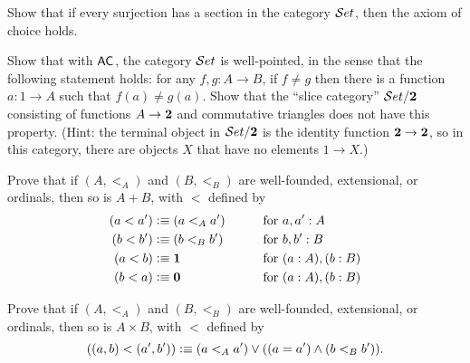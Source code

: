 \begin{ex}
  Show that if every surjection has a section in the category $\mathcal{S}et$, then the axiom of choice holds.
\end{ex}

\begin{ex}
Show that with $\mathsf{AC}_{}$, the category $\mathcal{S}et$ is well-pointed, in the sense that the following statement holds: for any $f, g : A\to B$, if $f \neq g$ then there is a function $a : 1\to A$ such that $f(a) \neq g(a)$.  Show that the ``slice category'' $\mathcal{S}et/\mathbf{2}$ consisting of functions $A\to \mathbf{2}$ and commutative triangles does not have this property. (Hint: the terminal object in $\mathcal{S}et/\mathbf{2}$ is the identity function $\mathbf{2} \to \mathbf{2}$, so in this category, there are objects $X$ that have no elements $1\to X$.)
\end{ex}

\begin{ex}
  Prove that if $(A,<_A)$ and $(B,<_B)$ are well-founded, extensional, or ordinals, then so is $A+B$, with $<$ defined by
  \begin{alignat*}{2}
    (a<a') &\vcentcolon\equiv (a<_A a') &\qquad\text{for }& a,a':A\\
    (b<b') &\vcentcolon\equiv (b<_B b') &\qquad\text{for }& b,b':B\\
    (a<b) &\vcentcolon\equiv \mathbf{1} &\qquad\text{for }& (a:A),(b:B)\\
    (b<a) &\vcentcolon\equiv \mathbf{0} &\qquad\text{for } &(a:A),(b:B)
  \end{alignat*}
\end{ex}

\begin{ex}
  Prove that if $(A,<_A)$ and $(B,<_B)$ are well-founded, extensional, or ordinals, then so is $A\times B$, with $<$ defined by
  \[ ((a,b) <(a',b')) \vcentcolon\equiv (a<_A a') \vee ((a=a') \wedge (b<_B b')). \]
\end{ex}

